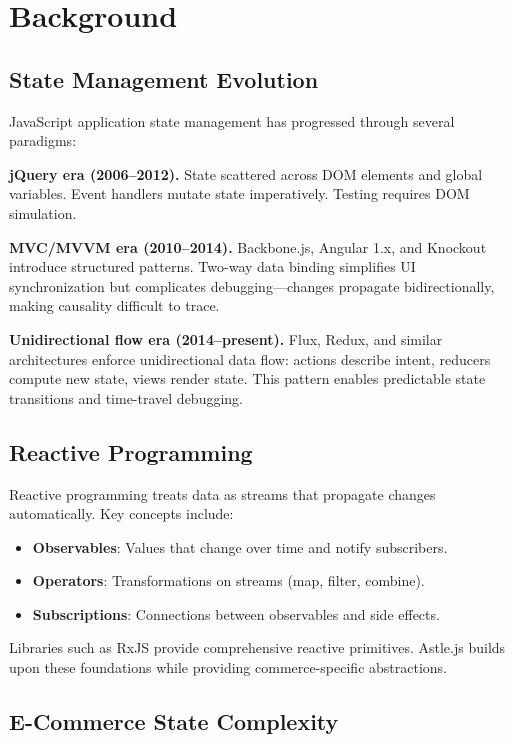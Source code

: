 \section{Background}


\subsection{State Management Evolution}

JavaScript application state management has progressed through several paradigms:

\textbf{jQuery era (2006--2012).} State scattered across DOM elements and global variables. Event handlers mutate state imperatively. Testing requires DOM simulation.

\textbf{MVC/MVVM era (2010--2014).} Backbone.js, Angular 1.x, and Knockout introduce structured patterns. Two-way data binding simplifies UI synchronization but complicates debugging—changes propagate bidirectionally, making causality difficult to trace.

\textbf{Unidirectional flow era (2014--present).} Flux, Redux, and similar architectures enforce unidirectional data flow: actions describe intent, reducers compute new state, views render state. This pattern enables predictable state transitions and time-travel debugging.

\subsection{Reactive Programming}

Reactive programming treats data as streams that propagate changes automatically. Key concepts include:

\begin{itemize}
\item \textbf{Observables}: Values that change over time and notify subscribers.
\item \textbf{Operators}: Transformations on streams (map, filter, combine).
\item \textbf{Subscriptions}: Connections between observables and side effects.
\end{itemize}

Libraries such as RxJS \cite{rxjs2015} provide comprehensive reactive primitives. Astle.js builds upon these foundations while providing commerce-specific abstractions.

\subsection{E-Commerce State Complexity}

